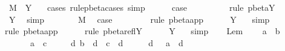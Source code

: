 \begin{isabellebody}
\ {}{\isacharcolon}\ {\isachardoublequoteopen}M{\isacharprime}{\isacharprime}\ {\isacharequal}\ Y\ {\isasymsigma}{\isachardoublequoteclose}\ \isamarkupfalse%
\ {\isacharparenleft}cases\ rule{\isacharcolon}pbeta{\isachardot}cases{\isacharcomma}\ simp{\isacharparenright}\isanewline
\ \ \ \ \isamarkupfalse%
\ {\isacharquery}case\ \isamarkupfalse%
\ {}\ {}\isanewline
\ \ \ \ \isamarkupfalse%
\ {\isacharparenleft}rule\ pbeta{\isachardot}Y{\isacharparenright}\isanewline
\ \ \ \ \isamarkupfalse%
\ {}\ Y\ \isamarkupfalse%
\ simp\isanewline
\ \ \isamarkupfalse%
\isanewline
\ \ \isamarkupfalse%
\ {\isacharparenleft}{}\ M{\isacharprime}{\isacharprime}{\isacharparenright}\ \isamarkupfalse%
\ {\isacharquery}case\ \isamarkupfalse%
\ {}\isanewline
\ \ \ \ \isamarkupfalse%
\ {\isacharparenleft}rule\ pbeta{\isachardot}app{\isacharparenright}\isanewline
\ \ \ \ \isamarkupfalse%
\ Y\ {}\ \isamarkupfalse%
\ simp\isanewline
\ \ \ \ \isamarkupfalse%
\ {\isacharparenleft}rule\ pbeta{\isachardot}app{\isacharparenright}\isanewline
\ \ \ \ \isamarkupfalse%
\ {\isacharparenleft}rule\ pbeta{\isachardot}reflY{\isacharparenright}\isanewline
\ \ \ \ \isamarkupfalse%
\ Y\ {}\ \isamarkupfalse%
\ simp\isanewline
\ \ \isamarkupfalse%
\isanewline
{}\isamarkupfalse%
%
\endisatagproof
{\isafoldproof}%
%
\isadelimproof
%
\endisadelimproof
%
\isamarkuptrue%
\isamarkupfalse%
\ Lem{}{\isacharunderscore}{}{\isacharunderscore}{}{\isacharcolon}\ \isanewline
\ \ \ {\isachardoublequoteopen}a\ {\isasymggreater}\ b{\isachardoublequoteclose}\isanewline
\ \ \ \ \ \ \ {\isachardoublequoteopen}a\ {\isasymggreater}\ c{\isachardoublequoteclose}\isanewline
\ \ \ \ \ {\isachardoublequoteopen}{\isasymexists}d{\isachardot}\ b\ {\isasymggreater}\ d\ {\isasymand}\ c\ {\isasymggreater}\ d{\isachardoublequoteclose}\isanewline
%
\isadelimproof
%
\endisadelimproof
%
\isatagproof
{}\isamarkupfalse%
\ {\isacharminus}\isanewline
\ \ \isamarkupfalse%
\ d\ \ {}{\isacharcolon}\ {\isachardoublequoteopen}a\ {\isachargreater}{\isachargreater}{\isachargreater}\ d{\isachardoublequoteclose}\ \isamarkupfalse%

\end{isabellebody}
